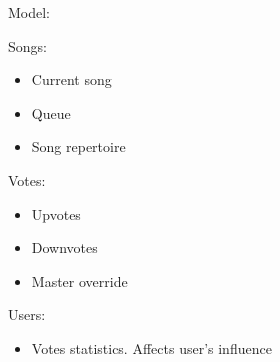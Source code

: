 
Model:

Songs:
\begin{itemize}
  \item Current song
  \item Queue
  \item Song repertoire
\end{itemize}

Votes:
\begin{itemize}
  \item Upvotes
  \item Downvotes
  \item Master override
\end{itemize}

Users:
\begin{itemize}
  \item Votes statistics. Affects user's influence
\end{itemize}


